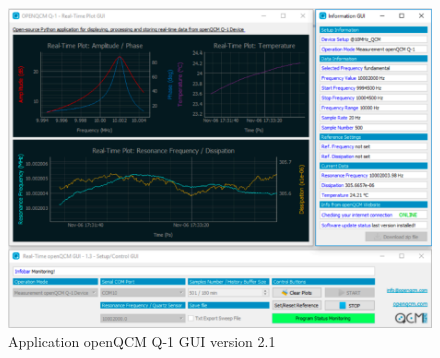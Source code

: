 \begin{figure}[H]
    \centering
    \includegraphics[width=\textwidth]{assets/figures/QCM-GUI.png}
    \caption{Application openQCM Q-1 GUI version 2.1}
    \label{fig:QCM-GUI}
\end{figure}